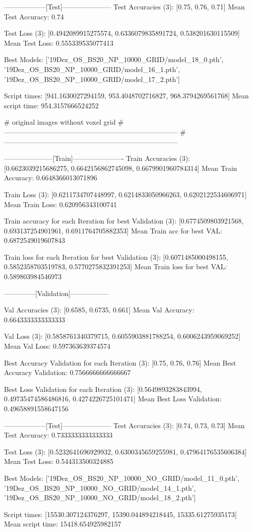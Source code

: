 ------------------[Test]---------------------
Test Accuracies (3): 
[0.75, 0.76, 0.71]
Mean Test Accuracy: 0.74

Test Loss (3): 
[0.4942089915275574, 0.6336079835891724, 0.538201630115509]
Mean Test Loss: 0.555339535077413

Best Models: 
['19Dez_OS_BS20_NP_10000_GRID/model_18_0.pth', '19Dez_OS_BS20_NP_10000_GRID/model_16_1.pth', '19Dez_OS_BS20_NP_10000_GRID/model_17_2.pth']



Script times: [941.1630027294159, 953.4048702716827, 968.3794269561768]
Mean script time: 954.3157666524252







# original images without voxel grid
#---------------------------------------------------------------------------
#---------------------------------------------------------------------------

---------------------[Train]----------------------
Train Accuracies (3): 
[0.6623039215686275, 0.6642156862745098, 0.6679901960784314]
Mean Train Accuracy: 0.6648366013071896

Train Loss (3): 
[0.6211734707448997, 0.6214833050966263, 0.6202122534606971]
Mean Train Loss: 0.620956343100741

Train accuracy for each Iteration for best Validation (3): 
[0.6774509803921568, 0.693137254901961, 0.6911764705882353]
Mean Train acc for best VAL: 0.6872549019607843

Train loss for each Iteration for best Validation (3): 
[0.6071485000498155, 0.5852358703519783, 0.5770275832391253]
Mean Train loss for best VAL: 0.589803984546973


--------------[Validation]-----------------

Val Accuracies (3): 
[0.6585, 0.6735, 0.661]
Mean Val Accuracy: 0.6643333333333333

Val Loss (3): 
[0.5858761340379715, 0.6055903881788254, 0.6006243959069252]
Mean Val Loss: 0.597363639374574

Best Accuracy Validation for each Iteration (3): 
[0.75, 0.76, 0.76]
Mean Best Accuracy Validation: 0.7566666666666667

Best Loss Validation for each Iteration (3): 
[0.5649893283843994, 0.49735474586486816, 0.4274226725101471]
Mean Best Loss Validation: 0.49658891558647156


------------------[Test]---------------------
Test Accuracies (3): 
[0.74, 0.73, 0.73]
Mean Test Accuracy: 0.7333333333333333

Test Loss (3): 
[0.5232641696929932, 0.6300345659255981, 0.47964176535606384]
Mean Test Loss: 0.544313500324885

Best Models: 
['19Dez_OS_BS20_NP_10000_NO_GRID/model_11_0.pth', '19Dez_OS_BS20_NP_10000_NO_GRID/model_14_1.pth', '19Dez_OS_BS20_NP_10000_NO_GRID/model_18_2.pth']



Script times: [15530.307124376297, 15390.044894218445, 15335.61275935173]
Mean script time: 15418.654925982157

